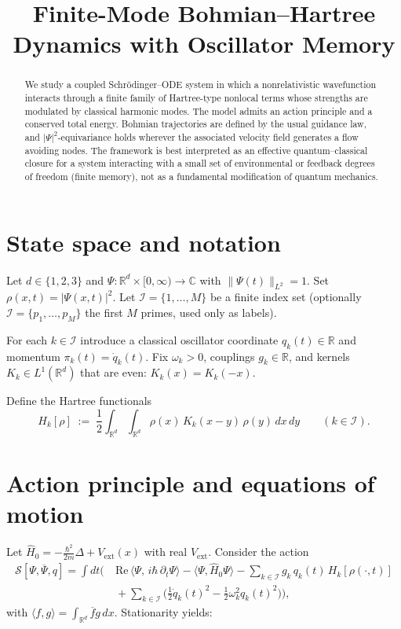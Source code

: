 \documentclass[11pt]{article}
\title{Finite-Mode Bohmian--Hartree Dynamics with Oscillator Memory}
\author{}
\date{}
\begin{document}
\maketitle

\begin{abstract}
We study a coupled Schr\"odinger--ODE system in which a nonrelativistic wavefunction
interacts through a finite family of Hartree-type nonlocal terms whose strengths are
modulated by classical harmonic modes. The model admits an action principle and a conserved
total energy. Bohmian trajectories are defined by the usual guidance law, and $|\Psi|^2$-equivariance
holds wherever the associated velocity field generates a flow avoiding nodes. The framework is
best interpreted as an effective quantum--classical closure for a system interacting with a small
set of environmental or feedback degrees of freedom (finite memory), not as a fundamental modification
of quantum mechanics.
\end{abstract}

\section{State space and notation}
Let $d\in\{1,2,3\}$ and $\Psi:\mathbb{R}^d\times[0,\infty)\to\mathbb{C}$ with $\|\Psi(t)\|_{L^2}=1$.
Set $\rho(x,t)=|\Psi(x,t)|^2$. Let $\mathcal{I}=\{1,\dots,M\}$ be a finite index set (optionally
$\mathcal{I}=\{p_1,\dots,p_M\}$ the first $M$ primes, used only as labels).

For each $k\in\mathcal{I}$ introduce a classical oscillator coordinate $q_k(t)\in\mathbb{R}$ and
momentum $\pi_k(t)=\dot q_k(t)$. Fix $\omega_k>0$, couplings $g_k\in\mathbb{R}$, and kernels
$K_k\in L^1(\mathbb{R}^d)$ that are even: $K_k(x)=K_k(-x)$.

Define the Hartree functionals
\[
H_k[\rho]\;:=\;\frac12\int_{\mathbb{R}^d}\int_{\mathbb{R}^d}\rho(x)\,K_k(x-y)\,\rho(y)\,dx\,dy
\qquad (k\in\mathcal{I}).
\]

\section{Action principle and equations of motion}
Let $\hat H_0=-\frac{\hbar^2}{2m}\Delta + V_{\mathrm{ext}}(x)$ with real $V_{\mathrm{ext}}$.
Consider the action
\begin{align*}
\mathcal{S}[\Psi,\overline{\Psi},q]
=\int dt\Big(
&\ \mathrm{Re}\,\langle \Psi,\, i\hbar\,\partial_t\Psi\rangle
-\langle \Psi,\hat H_0\Psi\rangle
-\sum_{k\in\mathcal{I}} g_k\,q_k(t)\,H_k[\rho(\cdot,t)]
\\
&\ +\sum_{k\in\mathcal{I}}\Big(\frac12\dot q_k(t)^2-\frac12\omega_k^2 q_k(t)^2\Big)
\Big),
\end{align*}
with $\langle f,g\rangle=\int_{\mathbb{R}^d}\overline{f}g\,dx$. Stationarity yields:
\end{document}
